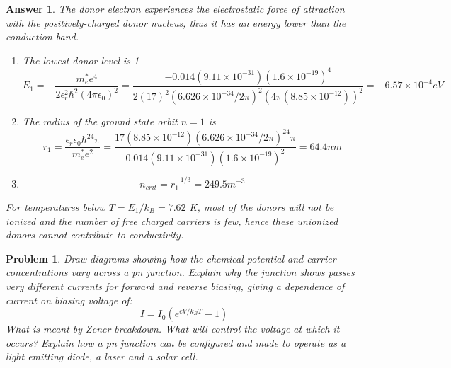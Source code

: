 \documentclass[a4paper]{article}
\newtheorem{ans}{Answer}[section]
\theoremstyle{new}
\newtheorem{qns}{Problem}[section]
\begin{document}
\begin{ans}
The donor electron experiences the electrostatic force of attraction with the positively-charged donor nucleus, thus it has an energy lower than the conduction band.
\begin{enumerate}[label=(\alph*)]
\item The lowest donor level is 1
$$E_1=-\frac{m_e^*e^4}{2\epsilon_r^2\hbar^2(4\pi\epsilon_0)^2}=\frac{-0.014(9.11\times10^{-31})(1.6\times10^{-19})^4}{2(17)^2(6.626\times10^{-34}/2\pi)^2(4\pi(8.85\times10^{-12}))^2}=-6.57\times10^{-4}eV$$
\item The radius of the ground state orbit $n=1$ is
$$r_1=\frac{\epsilon_r\epsilon_0\hbar^24\pi}{m_e^*e^2}=\frac{17(8.85\times10^{-12})(6.626\times10^{-34}/2\pi)^24\pi}{0.014(9.11\times10^{-31})(1.6\times10^{-19})^2}=64.4nm$$
\item 
$$n_{crit}=r_1^{-1/3}=249.5m^{-3}$$
\end{enumerate}
For temperatures below $T=E_1/k_B=7.62$ K, most of the donors will not be ionized and the number of free charged carriers is few, hence these unionized donors cannot contribute to conductivity.
\end{ans}
\newpage
\begin{qns}
Draw diagrams showing how the chemical potential and carrier concentrations vary across a pn junction. Explain why the junction shows passes very different currents for forward and reverse biasing, giving a dependence of current on biasing voltage of:
$$I=I_0(e^{eV/k_BT}-1)$$
What is meant by Zener breakdown. What will control the voltage at which it occurs? Explain how a pn junction can be configured and made to operate as a light emitting diode, a laser and a solar cell.
\end{qns}
\end{document}
